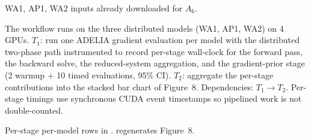 \documentclass[nonacm,sigconf]{acmart}
\begin{document}
WA1, AP1, WA2 inputs already downloaded for $A_6$.

\artcomp

The workflow runs on the three distributed models (WA1, AP1,
WA2) on 4 GPUs.
$T_1$: run one ADELIA gradient evaluation per model with the
distributed two-phase path instrumented to record per-stage
wall-clock for the forward pass, the backward solve, the
reduced-system aggregation, and the gradient-prior stage
(2 warmup + 10 timed evaluations, 95\% CI).
$T_2$: aggregate the per-stage contributions into the stacked
bar chart of Figure~8.
Dependencies: $T_1 \rightarrow T_2$.
Per-stage timings use synchronous CUDA event timestamps so
pipelined work is not double-counted.

\artout

Per-stage per-model rows in
.
 regenerates Figure~8.
\end{document}
